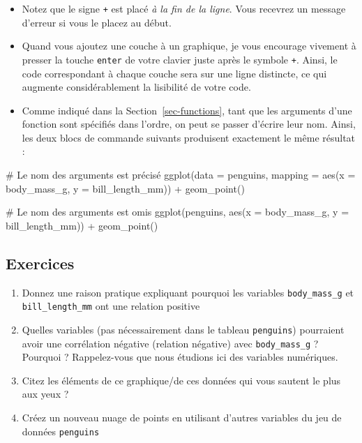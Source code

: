 \documentclass[
  letterpaper,
  DIV=11,
  numbers=noendperiod]{scrreprt}
\newenvironment{Shaded}{\begin{snugshade}}{\end{snugshade}}
\newcommand{\AttributeTok}[1]{\textcolor[rgb]{0.40,0.45,0.13}{#1}}
\newcommand{\CommentTok}[1]{\textcolor[rgb]{0.37,0.37,0.37}{#1}}
\newcommand{\FunctionTok}[1]{\textcolor[rgb]{0.28,0.35,0.67}{#1}}
\newcommand{\NormalTok}[1]{\textcolor[rgb]{0.00,0.23,0.31}{#1}}
\newcommand{\SpecialCharTok}[1]{\textcolor[rgb]{0.37,0.37,0.37}{#1}}
\providecommand{\tightlist}{%
  \setlength{\itemsep}{0pt}\setlength{\parskip}{0pt}}\usepackage{longtable,booktabs,array}
\begin{document}
\begin{itemize}
\tightlist
\item
  Notez que le signe \texttt{+} est placé \emph{à la fin de la ligne}.
  Vous recevrez un message d'erreur si vous le placez au début.
\item
  Quand vous ajoutez une couche à un graphique, je vous encourage
  vivement à presser la touche \texttt{enter} de votre clavier juste
  après le symbole \texttt{+}. Ainsi, le code correspondant à chaque
  couche sera sur une ligne distincte, ce qui augmente considérablement
  la lisibilité de votre code.
\item
  Comme indiqué dans la Section~\ref{sec-functions}, tant que les
  arguments d'une fonction sont spécifiés dans l'ordre, on peut se
  passer d'écrire leur nom. Ainsi, les deux blocs de commande suivants
  produisent exactement le même résultat :
\end{itemize}

\begin{Shaded}
\begin{Highlighting}[]
\CommentTok{\# Le nom des arguments est précisé}
\FunctionTok{ggplot}\NormalTok{(}\AttributeTok{data =}\NormalTok{ penguins, }\AttributeTok{mapping =} \FunctionTok{aes}\NormalTok{(}\AttributeTok{x =}\NormalTok{ body\_mass\_g, }\AttributeTok{y =}\NormalTok{ bill\_length\_mm)) }\SpecialCharTok{+}
  \FunctionTok{geom\_point}\NormalTok{()}

\CommentTok{\# Le nom des arguments est omis}
\FunctionTok{ggplot}\NormalTok{(penguins, }\FunctionTok{aes}\NormalTok{(}\AttributeTok{x =}\NormalTok{ body\_mass\_g, }\AttributeTok{y =}\NormalTok{ bill\_length\_mm)) }\SpecialCharTok{+}
  \FunctionTok{geom\_point}\NormalTok{()}
\end{Highlighting}
\end{Shaded}

\hypertarget{sec-Exo-3}{%
\subsection{Exercices}\label{sec-Exo-3}}

\begin{enumerate}
\def\labelenumi{\arabic{enumi}.}
\tightlist
\item
  Donnez une raison pratique expliquant pourquoi les variables
  \texttt{body\_mass\_g} et \texttt{bill\_length\_mm} ont une relation
  positive
\item
  Quelles variables (pas nécessairement dans le tableau
  \texttt{penguins}) pourraient avoir une corrélation négative (relation
  négative) avec \texttt{body\_mass\_g} ? Pourquoi ? Rappelez-vous que
  nous étudions ici des variables numériques.
\item
  Citez les éléments de ce graphique/de ces données qui vous sautent le
  plus aux yeux ?
\item
  Créez un nouveau nuage de points en utilisant d'autres variables du
  jeu de données \texttt{penguins}
\end{enumerate}
\end{document}

